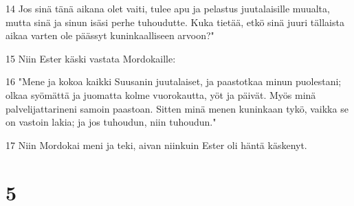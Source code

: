 \par 14 Jos sinä tänä aikana olet vaiti, tulee apu ja pelastus juutalaisille muualta, mutta sinä ja sinun isäsi perhe tuhoudutte. Kuka tietää, etkö sinä juuri tällaista aikaa varten ole päässyt kuninkaalliseen arvoon?"
\par 15 Niin Ester käski vastata Mordokaille:
\par 16 "Mene ja kokoa kaikki Suusanin juutalaiset, ja paastotkaa minun puolestani; olkaa syömättä ja juomatta kolme vuorokautta, yöt ja päivät. Myös minä palvelijattarineni samoin paastoan. Sitten minä menen kuninkaan tykö, vaikka se on vastoin lakia; ja jos tuhoudun, niin tuhoudun."
\par 17 Niin Mordokai meni ja teki, aivan niinkuin Ester oli häntä käskenyt.

\chapter{5}

